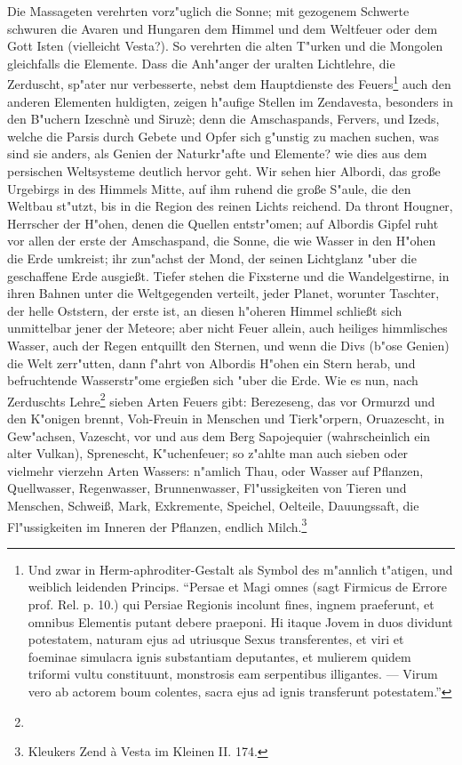 \documentclass[a4paper, 11pt, oneside, polutonikogreek, german]{article}
\begin{document}
Die Massageten verehrten vorz"uglich die Sonne; mit gezogenem Schwerte schwuren die Avaren und Hungaren dem Himmel und dem Weltfeuer oder dem Gott Isten (vielleicht Vesta?). So verehrten die alten T"urken und die Mongolen gleichfalls die Elemente. Dass die Anh"anger der uralten Lichtlehre, die Zerduscht, sp"ater nur verbesserte, nebst dem Hauptdienste des Feuers\footnote{Und zwar in Herm-aphroditer-Gestalt als Symbol des m"annlich t"atigen, und weiblich leidenden Princips. "`Persae et Magi omnes (sagt Firmicus de Errore prof. Rel. p. 10.) qui Persiae Regionis incolunt fines, ingnem praeferunt, et omnibus Elementis putant debere praeponi. Hi itaque Jovem in duos dividunt potestatem, naturam ejus ad utriusque Sexus transferentes, et viri et foeminae simulacra ignis substantiam deputantes, et mulierem quidem triformi vultu constituunt, monstrosis eam serpentibus illigantes. --- Virum vero ab actorem boum colentes, sacra ejus ad ignis transferunt potestatem."'} auch den anderen Elementen huldigten, zeigen h"aufige Stellen im Zendavesta, besonders in den B"uchern Izeschnè und Siruzè; denn die Amschaspands, Fervers, und Izeds, welche die Parsis durch Gebete und Opfer sich g"unstig zu machen suchen, was sind sie anders, als Genien der Naturkr"afte und Elemente? wie dies aus dem persischen Weltsysteme deutlich hervor geht. Wir sehen hier Albordi, das große Urgebirgs in des Himmels Mitte, auf ihm ruhend die große S"aule, die den Weltbau st"utzt, bis in die Region des reinen Lichts reichend. Da thront Hougner, Herrscher der H"ohen, denen die Quellen entstr"omen; auf Albordis Gipfel ruht vor allen der erste der Amschaspand, die Sonne, die wie Wasser in den H"ohen die Erde umkreist; ihr zun"achst der Mond, der seinen Lichtglanz "uber die geschaffene Erde ausgießt. Tiefer stehen die Fixsterne und die Wandelgestirne, in ihren Bahnen unter die Weltgegenden verteilt, jeder Planet, worunter Taschter, der helle Oststern, der erste ist, an diesen h"oheren Himmel schließt sich unmittelbar jener der Meteore; aber nicht Feuer allein, auch heiliges himmlisches Wasser, auch der Regen entquillt den Sternen, und wenn die Divs (b"ose Genien) die Welt zerr"utten, dann f"ahrt von Albordis H"ohen ein Stern herab, und befruchtende Wasserstr"ome ergießen sich "uber die Erde. Wie es nun, nach Zerduschts Lehre\footnote{} sieben Arten Feuers gibt: Berezeseng, das vor Ormurzd und den K"onigen brennt, Voh-Freuin in Menschen und Tierk"orpern, Oruazescht, in Gew"achsen, Vazescht, vor und aus dem Berg Sapojequier (wahrscheinlich ein alter Vulkan), Sprenescht, K"uchenfeuer; so z"ahlte man auch sieben oder vielmehr vierzehn Arten Wassers: n"amlich Thau, oder Wasser auf Pflanzen, Quellwasser, Regenwasser, Brunnenwasser, Fl"ussigkeiten von Tieren und Menschen, Schweiß, Mark, Exkremente, Speichel, Oelteile, Dauungssaft, die Fl"ussigkeiten im Inneren der Pflanzen, endlich Milch.\footnote{Kleukers Zend à Vesta im Kleinen II. 174.}
\end{document}
